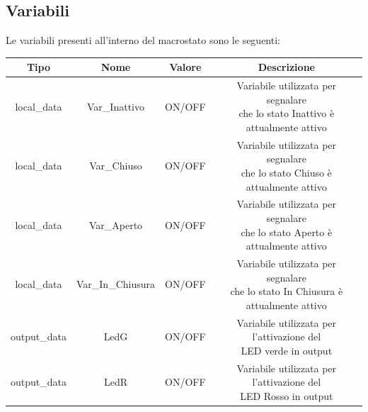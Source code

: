         \subsection{Variabili}
            Le variabili presenti all'interno del macrostato sono le seguenti:
            \begin{table}[H]
                \centering
                    \begin{tabular}{ | c | c | c | c |} 
                        \hline
                        \textbf{Tipo} & \textbf{Nome} & \textbf{Valore} & \textbf{Descrizione} \\
                        
                        \hline
                        local\_data & Var\_Inattivo & ON/OFF &  \makecell{Variabile utilizzata per segnalare \\ che lo stato Inattivo è attualmente attivo}\\
                        
                        \hline
                        local\_data & Var\_Chiuso & ON/OFF & \makecell{Variabile utilizzata per segnalare \\ che lo stato Chiuso è attualmente attivo} \\
                        
                        \hline
                        local\_data & Var\_Aperto & ON/OFF & \makecell{Variabile utilizzata per segnalare \\ che lo stato Aperto è attualmente attivo} \\
                        
                        \hline
                        local\_data & Var\_In\_Chiusura & ON/OFF & \makecell{Variabile utilizzata per segnalare \\ che lo stato In Chiusura è attualmente attivo} \\
                        
                        \hline
                        output\_data & LedG & ON/OFF & \makecell{Variabile utilizzata per l'attivazione del \\ LED verde in output} \\
                        
                        \hline
                        output\_data & LedR & ON/OFF & \makecell{Variabile utilizzata per l'attivazione del \\ LED Rosso in output} \\
                        

\end{tabular}
\end{table}
